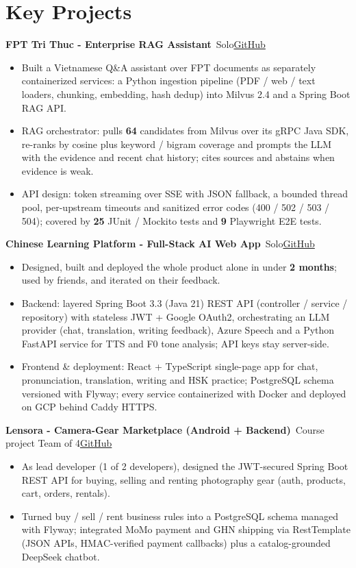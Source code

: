 \documentclass[10pt, a4paper]{article}
\newcommand{\project}[3]{\textbf{#1}\,{\color{MutedText}\textbar{} #2}\hfill\href{#3}{GitHub}\par}
\begin{document}
\section{Key Projects}
\project{FPT Tri Thuc - Enterprise RAG Assistant}{Solo}{https://github.com/minhphuong150505/milvus-rag-demo}
\begin{itemize}
  \item Built a Vietnamese Q\&A assistant over FPT documents as separately containerized services: a Python ingestion pipeline (PDF / web / text loaders, chunking, embedding, hash dedup) into Milvus 2.4 and a Spring Boot RAG API.
  \item RAG orchestrator: pulls \textbf{64} candidates from Milvus over its gRPC Java SDK, re-ranks by cosine plus keyword / bigram coverage and prompts the LLM with the evidence and recent chat history; cites sources and abstains when evidence is weak.
  \item API design: token streaming over SSE with JSON fallback, a bounded thread pool, per-upstream timeouts and sanitized error codes (400 / 502 / 503 / 504); covered by \textbf{25} JUnit / Mockito tests and \textbf{9} Playwright E2E tests.
\end{itemize}
\vspace{2pt}
\project{Chinese Learning Platform - Full-Stack AI Web App}{Solo}{https://github.com/minhphuong150505/Web_Chinese_Learning-}
\begin{itemize}
  \item Designed, built and deployed the whole product alone in under \textbf{2 months}; used by friends, and iterated on their feedback.
  \item Backend: layered Spring Boot 3.3 (Java 21) REST API (controller / service / repository) with stateless JWT + Google OAuth2, orchestrating an LLM provider (chat, translation, writing feedback), Azure Speech and a Python FastAPI service for TTS and F0 tone analysis; API keys stay server-side.
  \item Frontend \& deployment: React + TypeScript single-page app for chat, pronunciation, translation, writing and HSK practice; PostgreSQL schema versioned with Flyway; every service containerized with Docker and deployed on GCP behind Caddy HTTPS.
\end{itemize}
\vspace{2pt}
\project{Lensora - Camera-Gear Marketplace (Android + Backend)}{Course project \textbullet{} Team of 4}{https://github.com/minhphuong150505/Lensora}
\begin{itemize}
  \item As lead developer (1 of 2 developers), designed the JWT-secured Spring Boot REST API for buying, selling and renting photography gear (auth, products, cart, orders, rentals).
  \item Turned buy / sell / rent business rules into a PostgreSQL schema managed with Flyway; integrated MoMo payment and GHN shipping via RestTemplate (JSON APIs, HMAC-verified payment callbacks) plus a catalog-grounded DeepSeek chatbot.
\end{itemize}
\end{document}

